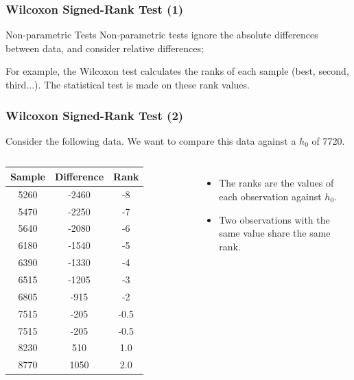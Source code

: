 \documentclass[10pt]{beamer}
\begin{document}
\begin{frame}
  \frametitle{Wilcoxon Signed-Rank Test (1)}
  
  \begin{block}{Non-parametric Tests}
    Non-parametric tests ignore the absolute differences between data,
    and consider relative differences;

    For example, the Wilcoxon test calculates the ranks of each sample
    (best, second, third...). The statistical test is made on these
    rank values.
  \end{block}
\end{frame}

\begin{frame}
  \frametitle{Wilcoxon Signed-Rank Test (2)}

    Consider the following data. We want to compare this data against
    a $h_0$ of 7720.

    \bigskip

    \begin{columns}
      \begin{tabular}{|c|c|c|}
        \hline
        Sample & Difference & Rank\\
        \hline
        5260 & -2460 & -8\\
        5470 & -2250 & -7\\
        5640 & -2080 & -6\\
        6180 & -1540 & -5\\
        6390 & -1330 & -4\\
        6515 & -1205 & -3\\
        6805 & -915 & -2\\
        7515 & -205 & -0.5\\
        7515 & -205 & -0.5\\
        8230 & 510 & 1.0\\
        8770 & 1050 & 2.0\\
        \hline
      \end{tabular}
      \begin{itemize}
      \item The ranks are the values of each observation against $h_0$.

        \bigskip

      \item Two observations with the same value share the same rank.
      \end{itemize}
    \end{columns}
\end{frame}
\end{document}
